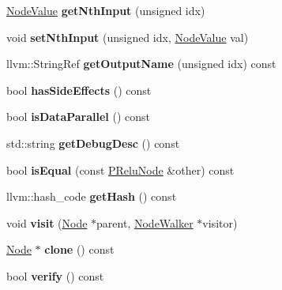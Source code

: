 \begin{DoxyCompactItemize}
\mbox{\label{classglow_1_1_p_relu_node_aefa862575f3278bc61e61183b75263be}} 
\hyperlink{structglow_1_1_node_value}{Node\+Value} {\bfseries get\+Nth\+Input} (unsigned idx)
\item 
\mbox{\label{classglow_1_1_p_relu_node_a236dca6f794385d92c09d6e6c55492cc}} 
void {\bfseries set\+Nth\+Input} (unsigned idx, \hyperlink{structglow_1_1_node_value}{Node\+Value} val)
\item 
\mbox{\label{classglow_1_1_p_relu_node_a6eb8c0352c9652a901cc55a1a4c18994}} 
llvm\+::\+String\+Ref {\bfseries get\+Output\+Name} (unsigned idx) const
\item 
\mbox{\label{classglow_1_1_p_relu_node_ab64d9daf288154e055ef888d304b89f4}} 
bool {\bfseries has\+Side\+Effects} () const
\item 
\mbox{\label{classglow_1_1_p_relu_node_a1641392d2fb5e0a73a37558e9fecb37b}} 
bool {\bfseries is\+Data\+Parallel} () const
\item 
\mbox{\label{classglow_1_1_p_relu_node_abda7326ca50ae9d99a79042b37fa0b92}} 
std\+::string {\bfseries get\+Debug\+Desc} () const
\item 
\mbox{\label{classglow_1_1_p_relu_node_a46ea64ead85b536e7435ded4f3c40ab9}} 
bool {\bfseries is\+Equal} (const \hyperlink{classglow_1_1_p_relu_node}{P\+Relu\+Node} \&other) const
\item 
\mbox{\label{classglow_1_1_p_relu_node_adbdd16de35901e2db9d26f98eeb41a21}} 
llvm\+::hash\+\_\+code {\bfseries get\+Hash} () const
\item 
\mbox{\label{classglow_1_1_p_relu_node_a9aa49339c60f8a1486150208b914d14d}} 
void {\bfseries visit} (\hyperlink{classglow_1_1_node}{Node} $\ast$parent, \hyperlink{classglow_1_1_node_walker}{Node\+Walker} $\ast$visitor)
\item 
\mbox{\label{classglow_1_1_p_relu_node_af5eb2bc6de40264258dbc053342e22ed}} 
\hyperlink{classglow_1_1_node}{Node} $\ast$ {\bfseries clone} () const
\item 
\mbox{\label{classglow_1_1_p_relu_node_a7682e99b29f25ab7f654b23628928849}} 
bool {\bfseries verify} () const
\end{DoxyCompactItemize}
